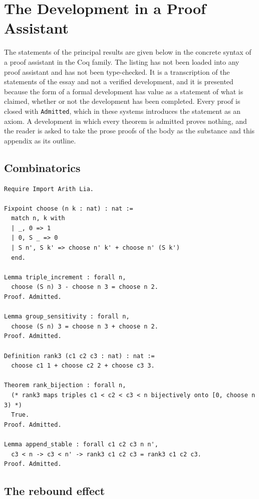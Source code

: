 \documentclass[11pt]{article}
\theoremstyle{plain}
\theoremstyle{definition}
\theoremstyle{remark}
\begin{document}
\section{The Development in a Proof Assistant}\label{app:coq}

The statements of the principal results are given below in the concrete syntax of a proof assistant in the Coq family. The listing has not been loaded into any proof assistant and has not been type-checked. It is a transcription of the statements of the essay and not a verified development, and it is presented because the form of a formal development has value as a statement of what is claimed, whether or not the development has been completed. Every proof is closed with \texttt{Admitted}, which in these systems introduces the statement as an axiom. A development in which every theorem is admitted proves nothing, and the reader is asked to take the prose proofs of the body as the substance and this appendix as its outline.

\subsection{Combinatorics}

\begin{lstlisting}
Require Import Arith Lia.

Fixpoint choose (n k : nat) : nat :=
  match n, k with
  | _, 0 => 1
  | 0, S _ => 0
  | S n', S k' => choose n' k' + choose n' (S k')
  end.

Lemma triple_increment : forall n,
  choose (S n) 3 - choose n 3 = choose n 2.
Proof. Admitted.

Lemma group_sensitivity : forall n,
  choose (S n) 3 = choose n 3 + choose n 2.
Proof. Admitted.

Definition rank3 (c1 c2 c3 : nat) : nat :=
  choose c1 1 + choose c2 2 + choose c3 3.

Theorem rank_bijection : forall n,
  (* rank3 maps triples c1 < c2 < c3 < n bijectively onto [0, choose n 3) *)
  True.
Proof. Admitted.

Lemma append_stable : forall c1 c2 c3 n n',
  c3 < n -> c3 < n' -> rank3 c1 c2 c3 = rank3 c1 c2 c3.
Proof. Admitted.
\end{lstlisting}

\subsection{The rebound effect}
\end{document}
